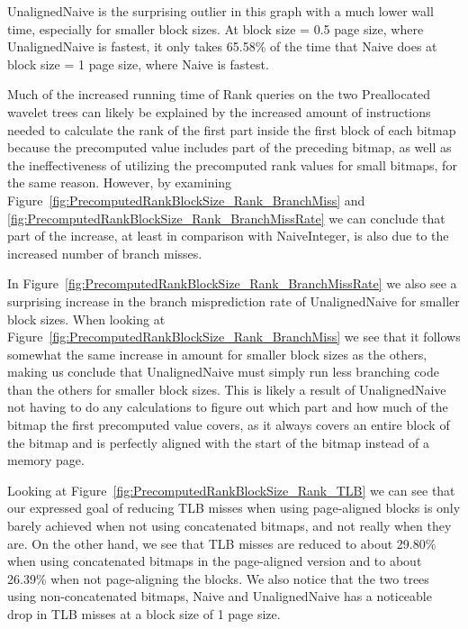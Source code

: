 UnalignedNaive is the surprising outlier in this graph with a much lower wall time, especially for smaller block sizes.
At block size = 0.5 page size, where UnalignedNaive is fastest, it only takes 65.58\% of the time that Naive does at block size = 1 page size, where Naive is fastest.

Much of the increased running time of Rank queries on the two Preallocated wavelet trees can likely be explained by the increased amount of instructions needed to calculate the rank of the first part inside the first block of each bitmap because the precomputed value includes part of the preceding bitmap, as well as the ineffectiveness of utilizing the precomputed rank values for small bitmaps, for the same reason.
However, by examining Figure~\ref{fig:PrecomputedRankBlockSize_Rank_BranchMiss} and \ref{fig:PrecomputedRankBlockSize_Rank_BranchMissRate} we can conclude that part of the increase, at least in comparison with NaiveInteger, is also due to the increased number of branch misses.

In Figure~\ref{fig:PrecomputedRankBlockSize_Rank_BranchMissRate} we also see a surprising increase in the branch misprediction rate of UnalignedNaive for smaller block sizes.
When looking at Figure~\ref{fig:PrecomputedRankBlockSize_Rank_BranchMiss} we see that it follows somewhat the same increase in amount for smaller block sizes as the others, making us conclude that UnalignedNaive must simply run less branching code than the others for smaller block sizes.
This is likely a result of UnalignedNaive not having to do any calculations to figure out which part and how much of the bitmap the first precomputed value covers, as it always covers an entire block of the bitmap and is perfectly aligned with the start of the bitmap instead of a memory page.

Looking at Figure~\ref{fig:PrecomputedRankBlockSize_Rank_TLB} we can see that our expressed goal of reducing TLB misses when using page-aligned blocks is only barely achieved when not using concatenated bitmaps, and not really when they are.
On the other hand, we see that TLB misses are reduced to about 29.80\% when using concatenated bitmaps in the page-aligned version and to about 26.39\% when not page-aligning the blocks.
We also notice that the two trees using non-concatenated bitmaps, Naive and UnalignedNaive has a noticeable drop in TLB misses at a block size of 1 page size.

